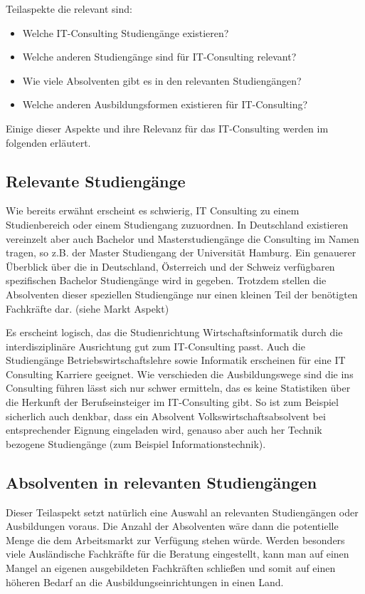 Teilaspekte die relevant sind:
\begin{itemize} 
\item Welche IT-Consulting Studiengänge existieren?
\item Welche anderen Studiengänge sind für IT-Consulting relevant?
\item Wie viele Absolventen gibt es in den relevanten Studiengängen?
\item Welche anderen Ausbildungsformen existieren für IT-Consulting?
\end{itemize}

Einige dieser Aspekte und ihre Relevanz für das IT-Consulting werden im folgenden erläutert.

\subsection{Relevante Studiengänge}
Wie bereits erwähnt erscheint es schwierig, IT Consulting zu einem Studienbereich oder einem Studiengang zuzuordnen. 
In Deutschland existieren vereinzelt aber auch Bachelor und Masterstudiengänge die Consulting im Namen tragen, so z.B. der Master Studiengang der Universität Hamburg. Ein genauerer Überblick über die in Deutschland, Österreich und der Schweiz verfügbaren spezifischen Bachelor Studiengänge wird in \cite{NissenKlaukDeelmannMohe201209} gegeben. Trotzdem stellen die Absolventen dieser speziellen Studiengänge nur einen kleinen Teil der benötigten Fachkräfte dar. (siehe Markt Aspekt)

Es erscheint logisch, das die Studienrichtung Wirtschaftsinformatik durch die interdisziplinäre Ausrichtung gut zum IT-Consulting passt. Auch die Studiengänge Betriebswirtschaftslehre sowie Informatik erscheinen für eine IT Consulting Karriere geeignet. Wie verschieden die Ausbildungswege sind die ins Consulting führen lässt sich nur schwer ermitteln, das es keine Statistiken über die Herkunft der Berufseinsteiger im IT-Consulting gibt.
So ist zum Beispiel sicherlich auch denkbar, dass ein Absolvent Volkswirtschaftsabsolvent bei entsprechender Eignung eingeladen wird, genauso aber auch her Technik bezogene Studiengänge (zum Beispiel Informationstechnik).

\subsection{Absolventen in relevanten Studiengängen}
Dieser Teilaspekt setzt natürlich eine Auswahl an relevanten Studiengängen oder Ausbildungen voraus. Die Anzahl der Absolventen wäre dann die potentielle Menge die dem Arbeitsmarkt zur Verfügung stehen würde. Werden besonders viele Ausländische Fachkräfte für die Beratung eingestellt, kann man auf einen Mangel an eigenen ausgebildeten Fachkräften schließen und somit auf einen höheren Bedarf an die Ausbildungseinrichtungen in einen Land.

